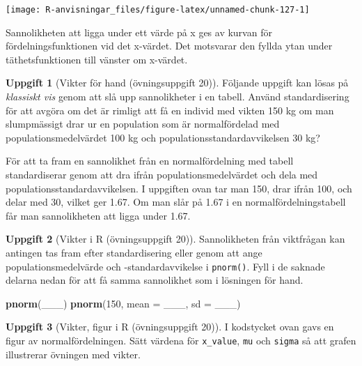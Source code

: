\documentclass[
]{book}
\newenvironment{Shaded}{\begin{snugshade}}{\end{snugshade}}
\newcommand{\AttributeTok}[1]{\textcolor[rgb]{0.13,0.29,0.53}{#1}}
\newcommand{\DecValTok}[1]{\textcolor[rgb]{0.00,0.00,0.81}{#1}}
\newcommand{\FunctionTok}[1]{\textcolor[rgb]{0.13,0.29,0.53}{\textbf{#1}}}
\newcommand{\NormalTok}[1]{#1}
\theoremstyle{definition}
\theoremstyle{definition}
\theoremstyle{definition}
\newtheorem{exercise}{Uppgift}[chapter]
\theoremstyle{definition}
\theoremstyle{remark}
\begin{document}
\begin{center}\texttt{[image: R-anvisningar\_files/figure-latex/unnamed-chunk-127-1]} \end{center}

Sannolikheten att ligga under ett värde på x ges av kurvan för fördelningsfunktionen vid det x-värdet. Det motsvarar den fyllda ytan under täthetsfunktionen till vänster om x-värdet.

\begin{exercise}[Vikter för hand (övningsuppgift 20)]
Följande uppgift kan lösas på \emph{klassiskt vis} genom att slå upp sannolikheter i en tabell.
Använd standardisering för att avgöra om det är rimligt att få en individ med vikten 150 kg om man slumpmässigt drar ur en population som är normalfördelad med populationsmedelvärdet 100 kg och populationsstandardavvikelsen 30 kg?
\end{exercise}

För att ta fram en sannolikhet från en normalfördelning med tabell standardiserar genom att dra ifrån populationsmedelvärdet och dela med populationsstandardavvikelsen.
I uppgiften ovan tar man 150, drar ifrån 100, och delar med 30, vilket ger 1.67.
Om man slår på 1.67 i en normalfördelningstabell får man sannolikheten att ligga under 1.67.

\begin{exercise}[Vikter i R (övningsuppgift 20)]

Sannolikheten från viktfrågan kan antingen tas fram efter standardisering eller genom att ange populationsmedelvärde och -standardavvikelse i \texttt{pnorm()}. Fyll i de saknade delarna nedan för att få samma sannolikhet som i lösningen för hand.

\begin{Shaded}
\begin{Highlighting}[]
\FunctionTok{pnorm}\NormalTok{(\_\_\_)}
\FunctionTok{pnorm}\NormalTok{(}\DecValTok{150}\NormalTok{, }\AttributeTok{mean =}\NormalTok{ \_\_\_, }\AttributeTok{sd =}\NormalTok{ \_\_\_)}
\end{Highlighting}
\end{Shaded}

\end{exercise}

\begin{exercise}[Vikter, figur i R (övningsuppgift 20)]
I kodstycket ovan gavs en figur av normalfördelningen. Sätt värdena för \texttt{x\_value}, \texttt{mu} och \texttt{sigma} så att grafen illustrerar övningen med vikter.
\end{exercise}
\end{document}
